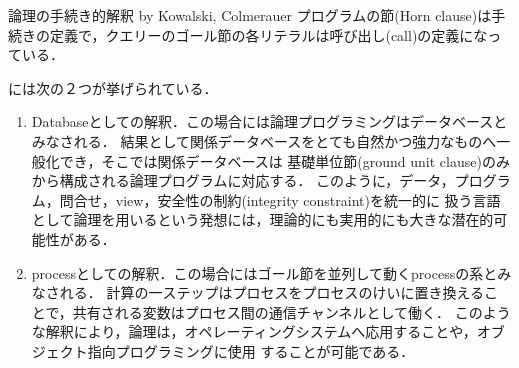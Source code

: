 \documentclass[uplatex, dvipdfmx]{jsreport}
\begin{document}
\begin{itembox}[l]{論理の手続き的解釈 by Kowalski, Colmerauer}
    プログラムの節(Horn clause)は手続きの定義で，クエリーのゴール節の各リテラルは呼び出し(call)の定義になっている．
\end{itembox}

\begin{remark}[論理の手続きとして以外の解釈]
    \cite{論理プログラミングの基礎}には次の２つが挙げられている．
    \begin{enumerate}
        \item Databaseとしての解釈．この場合には論理プログラミングはデータベースとみなされる．
        結果として関係データベースをとても自然かつ強力なものへ一般化でき，そこでは関係データベースは
        基礎単位節(ground unit clause)のみから構成される論理プログラムに対応する．
        このように，データ，プログラム，問合せ，view，安全性の制約(integrity constraint)を統一的に
        扱う言語として論理を用いるという発想には，理論的にも実用的にも大きな潜在的可能性がある．
        \item processとしての解釈．この場合にはゴール節を並列して動くprocessの系とみなされる．
        計算の一ステップはプロセスをプロセスのけいに置き換えることで，共有される変数はプロセス間の通信チャンネルとして働く．
        このような解釈により，論理は，オペレーティングシステムへ応用することや，オブジェクト指向プログラミングに使用
        することが可能である．
    \end{enumerate}
\end{remark}
\end{document}
